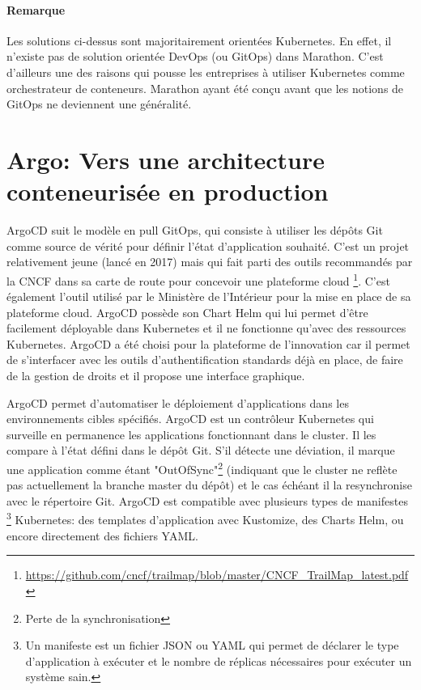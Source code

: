 \documentclass[11pt,fleqn]{book} %
\begin{document}
\begin{interrupt}
\paragraph{Remarque}
Les solutions ci-dessus sont majoritairement orientées Kubernetes. En effet, il n'existe pas de solution orientée DevOps (ou GitOps) dans Marathon. C'est d'ailleurs une des raisons qui pousse les entreprises à utiliser Kubernetes comme orchestrateur de conteneurs. Marathon ayant été conçu avant que les notions de GitOps ne deviennent une généralité.
\end{interrupt}
\section{Argo: Vers une architecture conteneurisée en production}
\label{argo}
ArgoCD suit le modèle en pull GitOps, qui consiste à utiliser les dépôts Git comme source de vérité pour définir l'état d'application souhaité. C'est un projet relativement jeune (lancé en 2017) mais qui fait parti des outils recommandés par la CNCF dans sa carte de route pour concevoir une plateforme cloud \footnote{\url{https://github.com/cncf/trailmap/blob/master/CNCF_TrailMap_latest.pdf}}. C'est également l'outil utilisé par le Ministère de l'Intérieur pour la mise en place de sa plateforme cloud.  ArgoCD possède son Chart Helm qui lui permet d'être facilement déployable dans Kubernetes et il ne fonctionne qu'avec des ressources Kubernetes. ArgoCD a été choisi pour la plateforme de l'innovation car il permet de s'interfacer avec les outils d'authentification standards déjà en place, de faire de la gestion de droits et il propose une interface graphique. \newline

ArgoCD permet d'automatiser le déploiement d'applications dans les environnements cibles spécifiés. ArgoCD est un contrôleur Kubernetes qui surveille en permanence les applications fonctionnant dans le cluster. Il les compare à l'état défini dans le dépôt Git. S'il détecte une déviation, il marque une application comme étant "OutOfSync"\footnote{Perte de la synchronisation} (indiquant que le cluster ne reflète pas actuellement la branche master du dépôt) et le cas échéant il la resynchronise avec le répertoire Git.  ArgoCD est compatible avec plusieurs types de manifestes \footnote{Un manifeste est un fichier JSON ou YAML qui permet de déclarer le type d'application à exécuter et le nombre de réplicas nécessaires pour exécuter un système sain.} Kubernetes: des templates d'application avec Kustomize, des Charts Helm, ou encore directement des fichiers YAML.\newline
\end{document}
